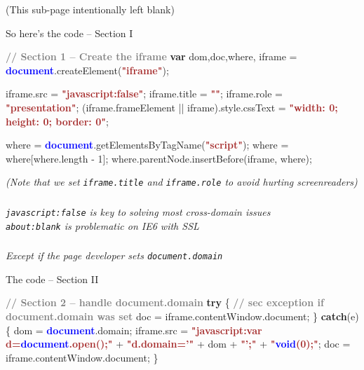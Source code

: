 \documentclass{beamer}
\newcommand{\innersplash}[1]{
  \begin{center}
    \Large \textrm{\textit{ #1 } }
  \end{center}
}
\newcommand{\splashslide}[2][{}]{
  \begin{frame}
  \frametitle{#1}
  \innersplash{#2}
  \end{frame}
}
\def\gray<#1>#2{\textcolor<#1>{gray}{\textbf<#1>{#2}}}
\def\brown<#1>#2{\textcolor<#1>{brown}{\textbf<#1>{#2}}}
\def\green<#1>#2{\textcolor<#1>{dark-green}{\textbf<#1>{#2}}}
\def\blue<#1>#2{\textcolor<#1>{blue}{\textbf<#1>{#2}}}
\begin{document}
\begin{frame}{(This sub-page intentionally left blank)}
\end{frame}

\begin{frame}[fragile]{So here's the code -- Section I}
\begin{semiverbatim}
\gray<1>{// Section 1 -- Create the iframe}
\green<1>{var} dom,doc,where,
    iframe = \blue<1>{document}.createElement(\brown<1>{"iframe"});

iframe.src = \brown<1>{"javascript:false"};
iframe.title = \brown<1>{""}; iframe.role = \brown<1>{"presentation"};
(iframe.frameElement || iframe).style.cssText =
    \brown<1>{"width: 0; height: 0; border: 0"};

where = \blue<1>{document}.getElementsByTagName(\brown<1>{"script"});
where = where[where.length - 1];
where.parentNode.insertBefore(iframe, where);
\end{semiverbatim}
\begin{center} \textrm{\textit{\small (Note that we set \texttt{iframe.title} and \texttt{iframe.role} to avoid hurting screenreaders)}} \end{center}
\end{frame}


\splashslide{\texttt{javascript:false} is key to solving most cross-domain issues \\ \vspace{2 cm} \tiny \texttt{about:blank} is problematic on IE6 with SSL}

\splashslide{Except if the page developer sets \texttt{document.domain}}

\begin{frame}
\end{frame}


\begin{frame}[fragile]{The code -- Section II}
\begin{semiverbatim}
\gray<1>{// Section 2 -- handle document.domain}
\green<1>{try} \{
    \gray<1>{// sec exception if document.domain was set}
    doc = iframe.contentWindow.document;
\}
\green<1>{catch}(e) \{
    dom = \blue<1>{document}.domain;
    iframe.src = 
        \brown<1>{"javascript:\green<1>{var} d=\blue<1>{document}.open();"} +
        \brown<1>{"d.domain='"} + dom + \brown<1>{"';"} + 
        \brown<1>{"\blue<1>{void}(0);"};
    doc = iframe.contentWindow.document;
\}
\end{semiverbatim}
\end{frame}
\end{document}
